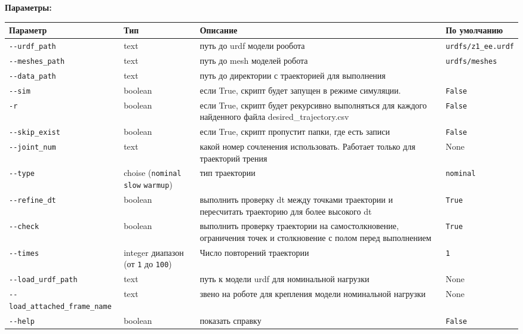 \textbf{Параметры:}
\begin{center}
\fontsize{10pt}{10pt}\selectfont
\begin{longtable}[]{p{5cm}|p{2cm}|p{3.5cm}|p{5cm}}
    \hline
\toprule()
Параметр & Тип & Описание & По умолчанию \\
\hline
\midrule()
\endhead
\texttt{-\/-urdf\_path} & text & путь до urdf модели рообота &
\texttt{urdfs/z1\_ee.urdf} \\
\hline
\texttt{-\/-meshes\_path} & text & путь до mesh моделей робота &
\texttt{urdfs/meshes} \\
\hline
\texttt{-\/-data\_path} & text & путь до директории с траекторией для выполнения \\
\hline
\texttt{-\/-sim} & boolean & если True, скрипт будет запущен в режиме симуляции. & \texttt{False} \\
\hline
\texttt{-r} & boolean & если True, скрипт будет рекурсивно выполняться для каждого найденного файла desired\_trajectory.csv & \texttt{False} \\
\hline
\texttt{-\/-skip\_exist} & boolean & если True, скрипт пропустит папки, где есть записи & \texttt{False} \\
\hline
\texttt{-\/-joint\_num} & text & какой номер сочленения использовать. Работает только для траекторий трения & None \\
\hline
\texttt{-\/-type} & choise (\texttt{nominal} \textbar{} \texttt{slow}
\textbar{} \texttt{warmup}) & тип траектории & \texttt{nominal} \\
\hline
\texttt{-\/-refine\_dt} & boolean & выполнить проверку dt между точками траектории и пересчитать траекторию для более высокого dt & \texttt{True} \\
\hline
\texttt{-\/-check} & boolean & выполнить проверку траектории на самостолкновение, ограничения точек и столкновение с полом перед выполнением &
\texttt{True} \\
\hline
\texttt{-\/-times} & integer диапазон (от \texttt{1} до \texttt{100})
& Число повторений траектории & \texttt{1} \\
\hline
\texttt{-\/-load\_urdf\_path} & text & путь к модели urdf для номинальной нагрузки & None \\
\hline
\texttt{-\/-load\_attached\_frame\_name} & text & звено на роботе для крепления модели номинальной нагрузки& None \\
\hline
\texttt{-\/-help} & boolean & показать справку &
\texttt{False} \\
\bottomrule()
\hline
\end{longtable}
\end{center}

